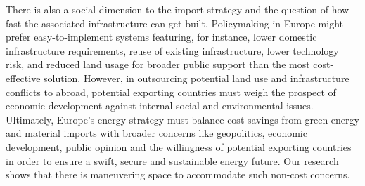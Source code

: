 There is also a social dimension to the import strategy and the question of how
fast the associated infrastructure can get built. Policymaking in Europe might
prefer easy-to-implement systems featuring, for instance, lower domestic
infrastructure requirements, reuse of existing infrastructure, lower technology
risk, and reduced land usage for broader public support than the most
cost-effective solution. However, in outsourcing potential land use and
infrastructure conflicts to abroad, potential exporting countries must weigh the
prospect of economic development against internal social and environmental
issues. Ultimately, Europe's energy strategy must balance cost savings from
green energy and material imports with broader concerns like geopolitics,
economic development, public opinion and the willingness of potential exporting
countries in order to ensure a swift, secure and sustainable energy future. Our
research shows that there is maneuvering space to accommodate such non-cost
concerns.
